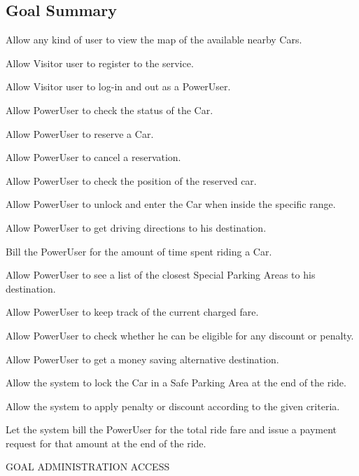 \subsection{Goal Summary}
\begin{enumerate}[label={[}G\arabic*{]}]
\item Allow any kind of user to view the map of the available nearby Cars.
\item Allow Visitor user to register to the service.
\item Allow Visitor user to log-in and out as a PowerUser.
\item Allow PowerUser to check the status of the Car.
\item Allow PowerUser to reserve a Car.
\item Allow PowerUser to cancel a reservation.
\item Allow PowerUser to check the position of the reserved car.
\item Allow PowerUser to unlock and enter the Car when inside the specific range.
\item Allow PowerUser to get driving directions to his destination.
\item Bill the PowerUser for the amount of time spent riding a Car.
\item Allow PowerUser to see a list of the closest Special Parking Areas to his destination.
\item Allow PowerUser to keep track of the current charged fare. 
\item Allow PowerUser to check whether he can be eligible for any discount or penalty.
\item Allow PowerUser to get a money saving alternative destination.
\item Allow the system to lock the Car in a Safe Parking Area at the end of the ride.
\item Allow the system to apply penalty or discount according to the given criteria.
\item Let the system bill the PowerUser for the total ride fare and issue a payment request for that amount at the end of the ride.
\item GOAL ADMINISTRATION ACCESS
\end{enumerate}
